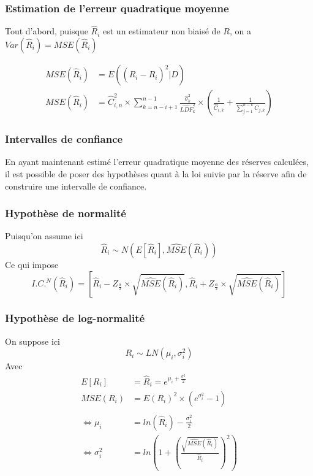 \documentclass[11pt,french]{report}
\begin{document}
\subsubsection*{Estimation de l'erreur quadratique moyenne}

Tout d'abord, puisque $\widehat{R}_i$ est un estimateur non biaisé de $R$, on a $Var(\widehat{R}_i)=MSE(\widehat{R}_i)$

$$\boxed{\begin{aligned}
MSE(\widehat{R}_i) &= E\left((\widehat{R}_i-R_i)^2 | D \right) \\
MSE(\widehat{R}_i) &= \widehat{C}_{i,n}^2 \times \sum_{k=n-i+1}^{n-1} \frac{\widehat{\sigma}_k^2}{\widehat{LDF}_k^2} \times \left(\frac{1}{\widehat{C}_{i,k}}+ \frac{1}{\sum_{j=1}^{n-k} C_{j,k}} \right)
\end{aligned}}$$

\subsubsection*{ Intervalles de confiance}

En ayant maintenant estimé l'erreur quadratique moyenne des réserves calculées, il est possible de poser des hypothèses quant à la loi suivie par la réserve afin de construire une intervalle de confiance.

\subsubsection*{ Hypothèse de normalité}

Puisqu'on assume ici
$$\widehat{R}_i \sim N(E[\widehat{R}_i], \widehat{MSE}(\widehat{R}_i))$$
Ce qui impose
$$\boxed{I.C.^N(\widehat{R}_i)=\left[\widehat{R}_i - Z_{\frac{\alpha}{2}} \times \sqrt{\widehat{MSE}(\widehat{R}_i)}, \widehat{R}_i + Z_{\frac{\alpha}{2}} \times \sqrt{\widehat{MSE}(\widehat{R}_i)} \right]}$$

\subsubsection*{ Hypothèse de log-normalité}

On suppose ici
$$R_i \sim LN(\mu_i, \sigma_i^2)$$
Avec
$$\begin{aligned}
E[R_i] &= \widehat{R}_i = e^{\mu_i + \frac{\sigma^2}{2}} \\
MSE(R_i) &= E(R_i)^2 \times \left(e^{\sigma_i^2}-1 \right) \\ \\
\Leftrightarrow \mu_i &= ln(\widehat{R}_i)-\frac{\sigma_i^2}{2} \\
\Leftrightarrow \sigma_i^2 &= ln \left(1 + \left(\frac{\sqrt{\widehat{MSE}(\widehat{R}_i)}}{\widehat{R}_i}\right)^2 \right)
\end{aligned}$$
\end{document}
